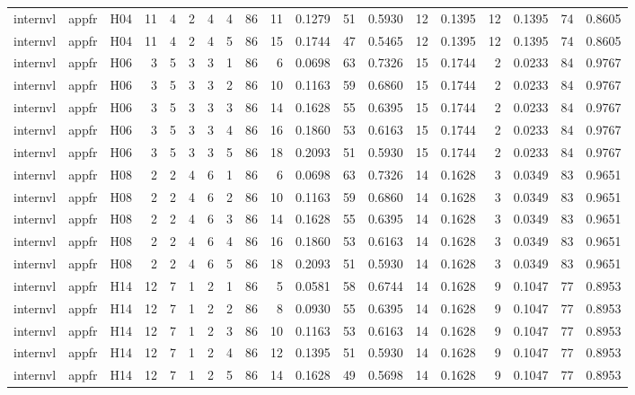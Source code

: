 \begin{longtable}{lllrrrrrrrrrrrrrrrr}
internvl & appfr & H04 & 11 & 4 & 2 & 4 & 4 & 86 & 11 & 0.1279 & 51 & 0.5930 & 12 & 0.1395 & 12 & 0.1395 & 74 & 0.8605 \\
internvl & appfr & H04 & 11 & 4 & 2 & 4 & 5 & 86 & 15 & 0.1744 & 47 & 0.5465 & 12 & 0.1395 & 12 & 0.1395 & 74 & 0.8605 \\
internvl & appfr & H06 & 3 & 5 & 3 & 3 & 1 & 86 & 6 & 0.0698 & 63 & 0.7326 & 15 & 0.1744 & 2 & 0.0233 & 84 & 0.9767 \\
internvl & appfr & H06 & 3 & 5 & 3 & 3 & 2 & 86 & 10 & 0.1163 & 59 & 0.6860 & 15 & 0.1744 & 2 & 0.0233 & 84 & 0.9767 \\
internvl & appfr & H06 & 3 & 5 & 3 & 3 & 3 & 86 & 14 & 0.1628 & 55 & 0.6395 & 15 & 0.1744 & 2 & 0.0233 & 84 & 0.9767 \\
internvl & appfr & H06 & 3 & 5 & 3 & 3 & 4 & 86 & 16 & 0.1860 & 53 & 0.6163 & 15 & 0.1744 & 2 & 0.0233 & 84 & 0.9767 \\
internvl & appfr & H06 & 3 & 5 & 3 & 3 & 5 & 86 & 18 & 0.2093 & 51 & 0.5930 & 15 & 0.1744 & 2 & 0.0233 & 84 & 0.9767 \\
internvl & appfr & H08 & 2 & 2 & 4 & 6 & 1 & 86 & 6 & 0.0698 & 63 & 0.7326 & 14 & 0.1628 & 3 & 0.0349 & 83 & 0.9651 \\
internvl & appfr & H08 & 2 & 2 & 4 & 6 & 2 & 86 & 10 & 0.1163 & 59 & 0.6860 & 14 & 0.1628 & 3 & 0.0349 & 83 & 0.9651 \\
internvl & appfr & H08 & 2 & 2 & 4 & 6 & 3 & 86 & 14 & 0.1628 & 55 & 0.6395 & 14 & 0.1628 & 3 & 0.0349 & 83 & 0.9651 \\
internvl & appfr & H08 & 2 & 2 & 4 & 6 & 4 & 86 & 16 & 0.1860 & 53 & 0.6163 & 14 & 0.1628 & 3 & 0.0349 & 83 & 0.9651 \\
internvl & appfr & H08 & 2 & 2 & 4 & 6 & 5 & 86 & 18 & 0.2093 & 51 & 0.5930 & 14 & 0.1628 & 3 & 0.0349 & 83 & 0.9651 \\
internvl & appfr & H14 & 12 & 7 & 1 & 2 & 1 & 86 & 5 & 0.0581 & 58 & 0.6744 & 14 & 0.1628 & 9 & 0.1047 & 77 & 0.8953 \\
internvl & appfr & H14 & 12 & 7 & 1 & 2 & 2 & 86 & 8 & 0.0930 & 55 & 0.6395 & 14 & 0.1628 & 9 & 0.1047 & 77 & 0.8953 \\
internvl & appfr & H14 & 12 & 7 & 1 & 2 & 3 & 86 & 10 & 0.1163 & 53 & 0.6163 & 14 & 0.1628 & 9 & 0.1047 & 77 & 0.8953 \\
internvl & appfr & H14 & 12 & 7 & 1 & 2 & 4 & 86 & 12 & 0.1395 & 51 & 0.5930 & 14 & 0.1628 & 9 & 0.1047 & 77 & 0.8953 \\
internvl & appfr & H14 & 12 & 7 & 1 & 2 & 5 & 86 & 14 & 0.1628 & 49 & 0.5698 & 14 & 0.1628 & 9 & 0.1047 & 77 & 0.8953 \\

\end{longtable}
